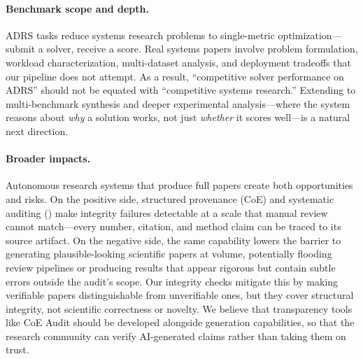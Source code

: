 \paragraph{Benchmark scope and depth.}
ADRS tasks reduce systems research problems to single-metric optimization---submit a solver, receive a score.
Real systems papers involve problem formulation, workload characterization, multi-dataset analysis, and deployment tradeoffs that our pipeline does not attempt.
As a result, ``competitive solver performance on ADRS'' should not be equated with ``competitive systems research.''
Extending to multi-benchmark synthesis and deeper experimental analysis---where the system reasons about \emph{why} a solution works, not just \emph{whether} it scores well---is a natural next direction.

\paragraph{Broader impacts.}
Autonomous research systems that produce full papers create both opportunities and risks.
On the positive side, structured provenance (CoE) and systematic auditing (\coeaudit{}) make integrity failures detectable at a scale that manual review cannot match---every number, citation, and method claim can be traced to its source artifact.
On the negative side, the same capability lowers the barrier to generating plausible-looking scientific papers at volume, potentially flooding review pipelines or producing results that appear rigorous but contain subtle errors outside the audit's scope.
Our integrity checks mitigate this by making verifiable papers distinguishable from unverifiable ones, but they cover structural integrity, not scientific correctness or novelty.
We believe that transparency tools like CoE Audit should be developed alongside generation capabilities, so that the research community can verify AI-generated claims rather than taking them on trust.

